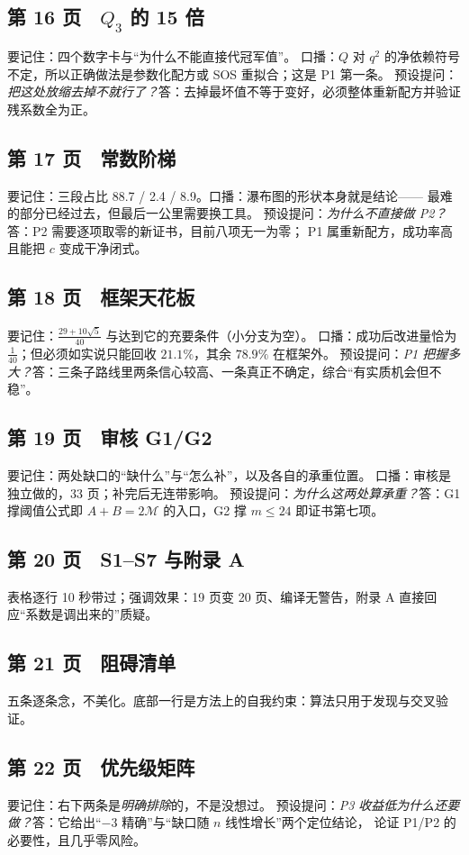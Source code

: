 \documentclass[UTF8,11pt]{ctexart}
\newcommand{\M}{\mathcal{M}}
\begin{document}
\subsection*{第 16 页　$Q_3$ 的 15 倍}
要记住：四个数字卡与``为什么不能直接代冠军值''。
口播：$Q$ 对 $q^2$ 的净依赖符号不定，所以正确做法是参数化配方或 SOS 重拟合；这是 P1 第一条。
预设提问：\emph{把这处放缩去掉不就行了？}答：去掉最坏值不等于变好，必须整体重新配方并验证残系数全为正。

\subsection*{第 17 页　常数阶梯}
要记住：三段占比 88.7 / 2.4 / 8.9。口播：瀑布图的形状本身就是结论——
最难的部分已经过去，但最后一公里需要换工具。
预设提问：\emph{为什么不直接做 P2？}答：P2 需要逐项取零的新证书，目前八项无一为零；
P1 属重新配方，成功率高且能把 $c$ 变成干净闭式。

\subsection*{第 18 页　框架天花板}
要记住：$\frac{29+10\sqrt5}{40}$ 与达到它的充要条件（小分支为空）。
口播：成功后改进量恰为 $\frac1{40}$；但必须如实说只能回收 $21.1\%$，其余 $78.9\%$ 在框架外。
预设提问：\emph{P1 把握多大？}答：三条子路线里两条信心较高、一条真正不确定，综合``有实质机会但不稳''。

\subsection*{第 19 页　审核 G1/G2}
要记住：两处缺口的``缺什么''与``怎么补''，以及各自的承重位置。
口播：审核是独立做的，33 页；补完后无连带影响。
预设提问：\emph{为什么这两处算承重？}答：G1 撑阈值公式即 $A+B=2\M$ 的入口，G2 撑 $m\le24$ 即证书第七项。

\subsection*{第 20 页　S1--S7 与附录 A}
表格逐行 10 秒带过；强调效果：19 页变 20 页、编译无警告，附录 A 直接回应``系数是调出来的''质疑。

\subsection*{第 21 页　阻碍清单}
五条逐条念，不美化。底部一行是方法上的自我约束：算法只用于发现与交叉验证。

\subsection*{第 22 页　优先级矩阵}
要记住：右下两条是\emph{明确排除}的，不是没想过。
预设提问：\emph{P3 收益低为什么还要做？}答：它给出``$-3$ 精确''与``缺口随 $n$ 线性增长''两个定位结论，
论证 P1/P2 的必要性，且几乎零风险。
\end{document}
